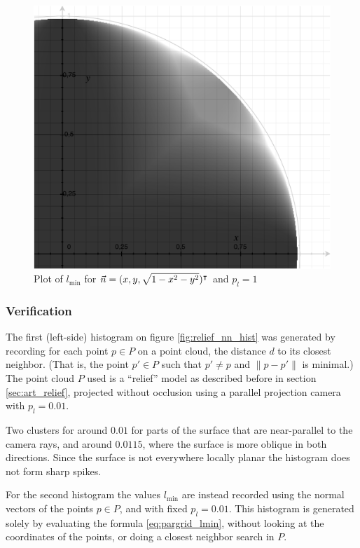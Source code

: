 \begin{figure}[p]
\centering
\includegraphics[width=.4\textwidth]{fig/lmin_plot.pdf}
\caption{Plot of $l_{\text{min}}$ for $\vec{n} = (x, y, \sqrt{1 - x^2 - y^2})^\intercal$ and $p_l = 1$}
\label{fig:lmin_plot}
\end{figure}


\subsubsection{Verification}
The first (left-side) histogram on figure \ref{fig:relief_nn_hist} was generated by recording for each point $p \in P$ on a point cloud, the distance $d$ to its closest neighbor. (That is, the point $p' \in P$ such that $p' \neq p$ and $\| p - p' \|$ is minimal.) The point cloud $P$ used is a ``relief'' model as described before in section \ref{sec:art_relief}, projected without occlusion using a parallel projection camera with $p_l = 0.01$.

Two clusters for around $0.01$ for parts of the surface that are near-parallel to the camera rays, and around $0.0115$, where the surface is more oblique in both directions. Since the surface is not everywhere locally planar the histogram does not form sharp spikes.

For the second histogram the values $l_{\text{min}}$ are instead recorded using the normal vectors of the points $p \in P$, and with fixed $p_l = 0.01$. This histogram is generated solely by evaluating the formula \ref{eq:pargrid_lmin}, without looking at the coordinates of the points, or doing a closest neighbor search in $P$.

